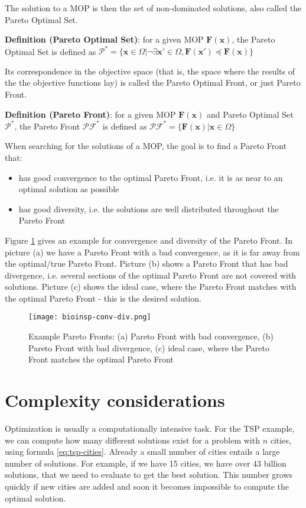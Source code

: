 The solution to a MOP is then the set of non-dominated solutions, also called the Pareto Optimal Set.

\noindent\textbf{Definition (Pareto Optimal Set)}: for a given MOP $\mathbf{F}(\mathbf{x})$, the Pareto Optimal Set is defined as $\mathcal{P}^* = \{\mathbf{x} \in \Omega | \neg \exists \mathbf{x'} \in \Omega, \mathbf{F}(\mathbf{x'}) \preceq \mathbf{F}(\mathbf{x}) \}$

Its correspondence in the objective space (that is, the space where the results of the the objective functions lay) is called the Pareto Optimal Front, or just Pareto Front.

\noindent\textbf{Definition (Pareto Front)}: for a given MOP $\mathbf{F}(\mathbf{x})$ and Pareto Optimal Set $\mathcal{P}^*$, the Pareto Front $\mathcal{PF}^*$ is defined as $\mathcal{PF}^* = \{\mathbf{F}(\mathbf{x}) | \mathbf{x} \in \Omega \}$

When searching for the solutions of a MOP, the goal is to find a Pareto Front that:
\begin{itemize}
  \item has good convergence to the optimal Pareto Front, i.e. it is as near to an optimal solution as possible
  \item has good diversity, i.e. the solutions are well distributed throughout the Pareto Front
\end{itemize}

Figure \ref{fig:conv-div} gives an example for convergence and diversity of the Pareto Front. In picture (a) we have a Pareto Front with a bad convergence, as it is far away from the optimal/true Pareto Front. Picture (b) shows a Pareto Front that has bad divergence, i.e. several sections of the optimal Pareto Front are not covered with solutions. Picture (c) shows the ideal case, where the Pareto Front matches with the optimal Pareto Front - this is the desired solution.

\begin{figure}[ht!]
  \centering
  \texttt{[image: bioinsp-conv-div.png]}
  \caption{Example Pareto Fronts: (a) Pareto Front with bad convergence, (b) Pareto Front with bad divergence, (c) ideal case, where the Pareto Front matches the optimal Pareto Front}
  \label{fig:conv-div}
\end{figure}

\section{Complexity considerations}
Optimization is usually a computationally intensive task. For the TSP example, we can compute how many different solutions exist for a problem with $n$ cities, using formula \eqref{eq:tsp-cities}. Already a small number of cities entails a large number of solutions. For example, if we have 15 cities, we have over 43 billion solutions, that we need to evaluate to get the best solution. This number grows quickly if new cities are added and soon it becomes impossible to compute the optimal solution.


